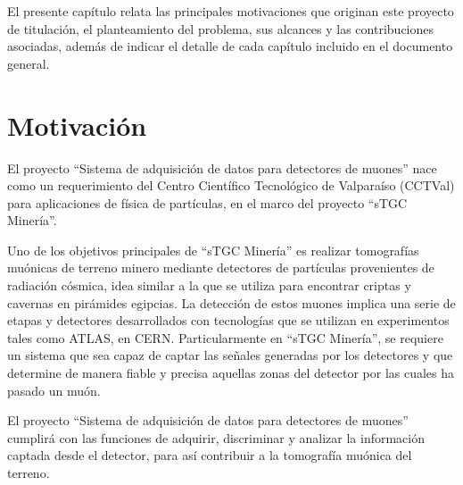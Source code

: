 
El presente capítulo relata las principales motivaciones que originan este proyecto de titulación, el planteamiento del problema, sus alcances y las contribuciones asociadas, además de indicar el detalle de cada capítulo incluido en el documento general. 

\section{Motivación}
	\par El proyecto ``Sistema de adquisición de datos para detectores de muones'' nace como un requerimiento del Centro Científico Tecnológico de Valparaíso (CCTVal) para aplicaciones de física de partículas, en el marco del proyecto ``sTGC Minería''. 
	
	\par Uno de los objetivos principales de ``sTGC Minería'' es realizar tomografías muónicas de terreno minero mediante detectores de partículas provenientes de radiación cósmica, idea similar a la que se utiliza para encontrar criptas y cavernas en pirámides egipcias. La detección de estos muones implica una serie de etapas y detectores desarrollados con tecnologías que se utilizan en experimentos tales como ATLAS, en CERN. Particularmente en ``sTGC Minería'', se requiere un sistema que sea capaz de captar las señales generadas por los detectores y que determine de manera fiable y precisa aquellas zonas del detector por las cuales ha pasado un muón.
	
	\par El proyecto ``Sistema de adquisición de datos para detectores de muones'' cumplirá con las funciones de adquirir, discriminar y analizar la información captada desde el detector, para así contribuir a la tomografía muónica del terreno.

